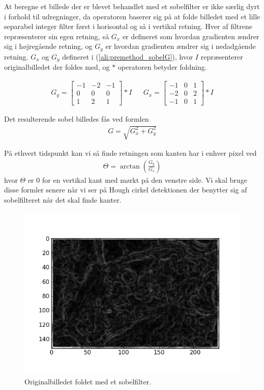 At beregne et billede der er blevet behandlet med et sobelfilter er ikke særlig dyrt i forhold til udregninger, da operatoren baserer sig på at folde billedet med et lille separabel integer filter først i horisontal og så i vertikal retning. Hver af filtrene repræsenterer sin egen retning, så $G_x$ er defineret som hvordan gradienten ændrer sig i højregående retning, og $G_y$ er hvordan gradienten ændrer sig i nedadgående retning. $G_x$ og $G_y$ defineret i  (\ref{ali:premethod_sobelG}), hvor $I$ repræsenterer originalbilledet der foldes med, og $*$ operatoren betyder foldning.

\begin{align}
	G_y = \begin{bmatrix}
		-1 & -2 & -1\\
		0 & 0 & 0\\
		1 & 2 & 1
	\end{bmatrix} * I
	&&
	G_x = \begin{bmatrix}
		-1 & 0 & 1\\
		-2 & 0 & 2\\
		-1 & 0 & 1
	\end{bmatrix} * I
	\label{ali:premethod_sobelG}
\end{align} 

Det resulterende sobel billedes fås ved formlen 
\begin{align}
	G = \sqrt{G_x^2 + G_y^2}
\end{align}

På ethvert tidspunkt kan vi så finde retningen som kanten har i enhver pixel ved 
\begin{align}
	\Theta = \arctan\left(\frac{G_y}{G_x}\right)
	\label{ali:premethod_sobelTheta}
\end{align}
hvor $\Theta$ er 0 for en vertikal kant med mørkt på den venstre side. Vi skal bruge disse formler senere når vi ser på Hough cirkel detektionen der benytter sig af sobelfilteret når det skal finde kanter. 

\begin{figure}[H]
	\centering
	\includegraphics[scale=0.8]{files/premethod/img/sobel.png}
	\caption{Originalbilledet foldet med et sobelfilter.\label{fig:premethod_sobel}}
\end{figure}

